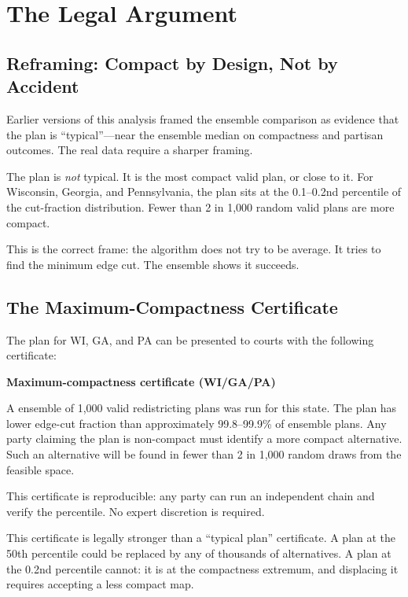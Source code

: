 \section{The Legal Argument}
\label{sec:legal}

\subsection{Reframing: Compact by Design, Not by Accident}

Earlier versions of this analysis framed the ensemble comparison as evidence
that the \ar{} plan is ``typical''---near the ensemble median on compactness
and partisan outcomes.  The real data require a sharper framing.

The \ar{} plan is \emph{not} typical.  It is the most compact valid plan,
or close to it.  For Wisconsin, Georgia, and Pennsylvania, the plan sits at
the 0.1--0.2nd percentile of the cut-fraction distribution.  Fewer than 2 in
1,000 random valid plans are more compact.

This is the correct frame: the algorithm does not try to be average.
It tries to find the minimum edge cut.  The ensemble shows it succeeds.

\subsection{The Maximum-Compactness Certificate}

The \ar{} plan for WI, GA, and PA can be presented to courts with the
following certificate:

\begin{keybox}
\textbf{Maximum-compactness certificate (WI/GA/PA)}

A \gc{} \recom{} ensemble of 1,000 valid redistricting plans was run for
this state.  The \ar{} plan has lower edge-cut fraction than
approximately 99.8--99.9\% of ensemble plans.  Any party claiming the
\ar{} plan is non-compact must identify a more compact alternative.
Such an alternative will be found in fewer than 2 in 1,000 random draws
from the feasible space.

This certificate is reproducible: any party can run an independent \recom{}
chain and verify the percentile.  No expert discretion is required.
\end{keybox}

This certificate is legally stronger than a ``typical plan'' certificate.
A plan at the 50th percentile could be replaced by any of thousands of
alternatives.  A plan at the 0.2nd percentile cannot: it is at the
compactness extremum, and displacing it requires accepting a less compact
map.

